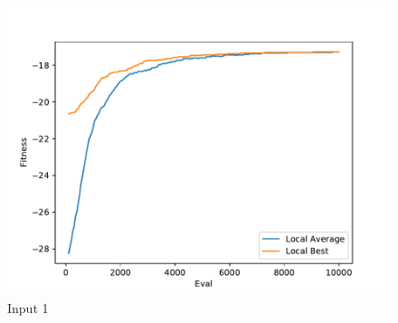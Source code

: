 \documentclass{standalone}
\begin{document}
\begin{figure}[!htb]
	\caption{Input 1}
	\label{fig:graph_1062}
	\includegraphics[width=\textwidth]{../graphs/graphs/1062.pdf}
\end{figure}
\end{document}
